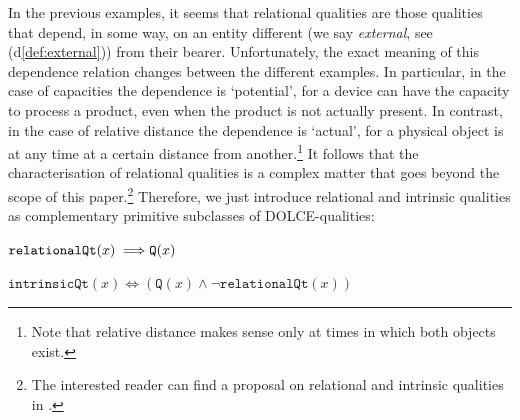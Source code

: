 \documentclass[sw]{iosart2x}
\newcommand{\bflist}{\begin{list}{}{\setlength{\topsep}{2mm}\setlength{\partopsep}{0mm}\setlength{\parsep}{0mm}\setlength{\leftmargin}{9mm}\setlength{\labelwidth}{8mm}}}
\newcommand{\eflist}{\end{list}}
\newcommand{\AxLabel}{\textrm{a}}
\newcommand{\DefLabel}{\textrm{d}}
\newcounter{cntax}
\newcommand{\myax}[1]{\refstepcounter{cntax}\begin{small}{\bf \AxLabel\thecntax\label{ax:#1}}\end{small}}
\newcounter{cntdef}
\newcommand{\mydf}[1]{\refstepcounter{cntdef}\begin{small}{\bf \DefLabel\thecntdef\label{def:#1}}\end{small}}
\newcommand{\mytext}[1]{``#1''}
\newcommand{\refdf}[1]{({\DefLabel}\ref{#1})}
\newcommand{\generalStyle}[1]{\texttt{#1}}
\newcommand{\uniRel}[2]{\generalStyle{#1}(#2)}
\newcommand{\myiff}{\Longleftrightarrow}
\newcommand{\myfi}{\hspace{0.9mm} \Longrightarrow}
\newcommand{\DOLCE}{\textsc{DOLCE}\xspace} %
\newcommand{\DOLCEQuality}[1]{\uniRel{Q}{#1}}
\newcommand{\RelationalQuality}[1]{\uniRel{relationalQt}{#1}}
\newcommand{\IntrinsicQuality}[1]{\uniRel{intrinsicQt}{#1}}
\newcommand{\firstTimeKeyWord}[1]{\textit{#1}}
\begin{document}
In the previous examples, it seems that relational qualities are those qualities that depend, in some way, on an entity different (we say \firstTimeKeyWord{external}, see \refdf{def:external}) from their bearer. Unfortunately, the exact meaning of this dependence relation changes between the different examples. In particular, in the case of capacities the dependence is `potential', for a device can have the capacity to process a product, even when the product is not actually present. In contrast, in the case of relative distance the dependence is `actual', for a physical object is at any time at a certain distance from another.\footnote{Note that relative distance makes sense only at times in which both objects exist.}
It follows that the characterisation of relational qualities is a complex matter that goes beyond the scope of this paper.\footnote{The interested reader can find a proposal on relational and intrinsic qualities in \cite{fonsecaRelationsOntologyDrivenConceptual2019}.} Therefore, we just introduce relational and intrinsic qualities as complementary primitive subclasses of \DOLCE-qualities: 
\bflist
  \item[\myax{relationalQtPartialDef}] $ \RelationalQuality{x} \myfi \DOLCEQuality{x} $ 
  \item[\mydf{intrinsicQtPartialDef}] $ \IntrinsicQuality{x} \myiff  ( \DOLCEQuality{x} \land \neg  \RelationalQuality{x})$
\eflist
\end{document}
